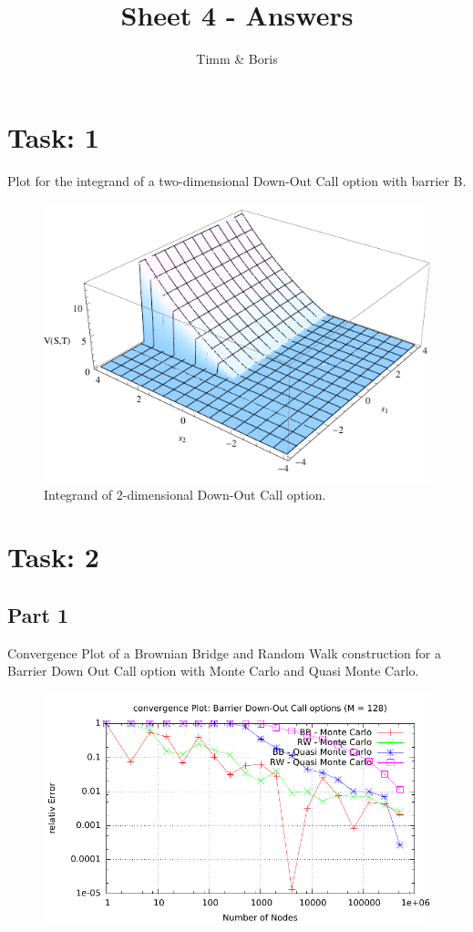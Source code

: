 \documentclass{article}
\title{Sheet 4 - Answers}
\author{Timm \& Boris}
\begin{document}
\maketitle

\section*{Task: 1}
Plot for the integrand of a two-dimensional Down-Out Call option with barrier B.
\begin{figure}[htbp]
  \centering
     \includegraphics[width=1.0\textwidth]{../Task01/task01_plot.pdf}
  \caption*{Integrand of 2-dimensional Down-Out Call option.}
\end{figure}

\section*{Task: 2}
\subsection*{Part 1}
Convergence Plot of a Brownian Bridge and Random Walk construction for a Barrier Down Out Call option with Monte Carlo and Quasi Monte Carlo.
\begin{figure}[htbp]
  \centering
     \includegraphics[width=1.0\textwidth]{../Task02/sh4_task02_convergencePlot.pdf}
\end{figure}
\end{document}
